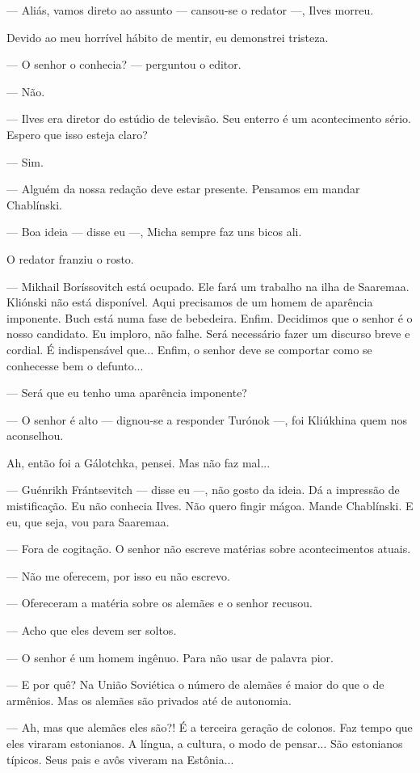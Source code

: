 --- Aliás, vamos direto ao assunto --- cansou-se o redator ---, Ilves
morreu.

Devido ao meu horrível hábito de mentir, eu demonstrei tristeza.

--- O senhor o conhecia? --- perguntou o editor.

--- Não.

--- Ilves era diretor do estúdio de televisão. Seu enterro é um
acontecimento sério. Espero que isso esteja claro?

--- Sim.

--- Alguém da nossa redação deve estar presente. Pensamos em mandar
Chablínski.

--- Boa ideia --- disse eu ---, Micha sempre faz uns bicos ali.

O redator franziu o rosto.

--- Mikhail Boríssovitch está ocupado. Ele fará um trabalho na ilha de
Saaremaa. Kliónski não está disponível. Aqui precisamos de um homem de
aparência imponente. Buch está numa fase de bebedeira. Enfim. Decidimos
que o senhor é o nosso candidato. Eu imploro, não falhe. Será necessário
fazer um discurso breve e cordial. É indispensável que... Enfim, o
senhor deve se comportar como se conhecesse bem o defunto...

--- Será que eu tenho uma aparência imponente?

--- O senhor é alto --- dignou-se a responder Turónok ---, foi Kliúkhina
quem nos aconselhou.

Ah, então foi a Gálotchka, pensei. Mas não faz mal...

--- Guénrikh Frántsevitch --- disse eu ---, não gosto da ideia. Dá a
impressão de mistificação. Eu não conhecia Ilves. Não quero fingir
mágoa. Mande Chablínski. E eu, que seja, vou para Saaremaa.

--- Fora de cogitação. O senhor não escreve matérias sobre
acontecimentos atuais.

--- Não me oferecem, por isso eu não escrevo.

--- Ofereceram a matéria sobre os alemães e o senhor recusou.

--- Acho que eles devem ser soltos.

--- O senhor é um homem ingênuo. Para não usar de palavra pior.

--- E por quê? Na União Soviética o número de alemães é maior do que o
de armênios. Mas os alemães são privados até de autonomia.

--- Ah, mas que alemães eles são?! É a terceira geração de colonos. Faz
tempo que eles viraram estonianos. A língua, a cultura, o modo de
pensar... São estonianos típicos. Seus pais e avôs viveram na Estônia...

